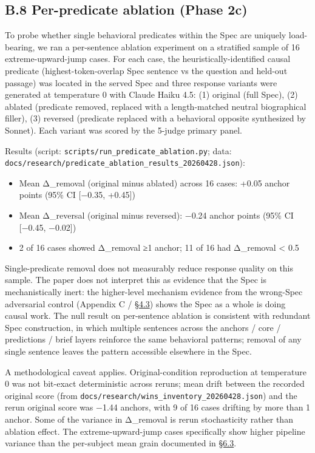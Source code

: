 \hypertarget{b.8-per-predicate-ablation-phase-2c}{%
\subsection{B.8 Per-predicate ablation (Phase
2c)}\label{b.8-per-predicate-ablation-phase-2c}}

To probe whether single behavioral predicates within the Spec are
uniquely load-bearing, we ran a per-sentence ablation experiment on a
stratified sample of 16 extreme-upward-jump cases. For each case, the
heuristically-identified causal predicate (highest-token-overlap Spec
sentence vs the question and held-out passage) was located in the served
Spec and three response variants were generated at temperature 0 with
Claude Haiku 4.5: (1) original (full Spec), (2) ablated (predicate
removed, replaced with a length-matched neutral biographical filler),
(3) reversed (predicate replaced with a behavioral opposite synthesized
by Sonnet). Each variant was scored by the 5-judge primary panel.

Results (script: \texttt{scripts/run\_predicate\_ablation.py}; data:
\texttt{docs/research/predicate\_ablation\_results\_20260428.json}):

\begin{itemize}
\tightlist
\item
  Mean Δ\_removal (original minus ablated) across 16 cases: +0.05 anchor
  points (95\% CI {[}−0.35, +0.45{]})
\item
  Mean Δ\_reversal (original minus reversed): −0.24 anchor points (95\%
  CI {[}−0.45, −0.02{]})
\item
  2 of 16 cases showed Δ\_removal ≥1 anchor; 11 of 16 had Δ\_removal
  \textless{} 0.5
\end{itemize}

Single-predicate removal does not measurably reduce response quality on
this sample. The paper does not interpret this as evidence that the Spec
is mechanistically inert: the higher-level mechanism evidence from the
wrong-Spec adversarial control (Appendix C / \hyperref[mechanism-correct-content-not-format]{§4.3}) shows the Spec as a
whole is doing causal work. The null result on per-sentence ablation is
consistent with redundant Spec construction, in which multiple sentences
across the anchors / core / predictions / brief layers reinforce the
same behavioral patterns; removal of any single sentence leaves the
pattern accessible elsewhere in the Spec.

A methodological caveat applies. Original-condition reproduction at
temperature 0 was not bit-exact deterministic across reruns; mean drift
between the recorded original score (from
\texttt{docs/research/wins\_inventory\_20260428.json}) and the rerun
original score was −1.44 anchors, with 9 of 16 cases drifting by more
than 1 anchor. Some of the variance in Δ\_removal is rerun stochasticity
rather than ablation effect. The extreme-upward-jump cases specifically
show higher pipeline variance than the per-subject mean grain documented
in \hyperref[pipeline-and-specification-stability]{§6.3}.

